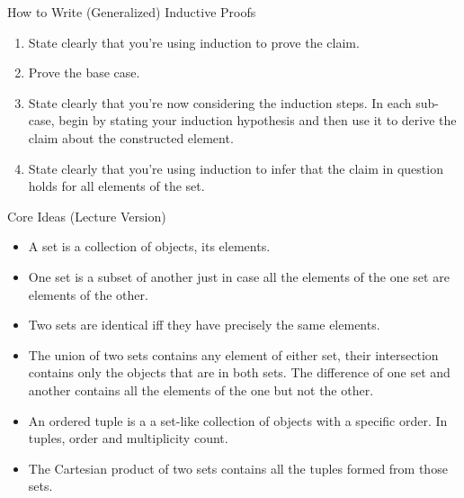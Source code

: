 \documentclass[../slides.tex]{subfiles}
\begin{document}
\begin{frame}{How to Write (Generalized) Inductive Proofs}


	\begin{enumerate}[1.]
		
			\item State clearly that you're using induction to prove the claim.
			
			\item Prove the base case. 
			
			\item State clearly that you're now considering the induction steps. In each sub-case, begin by stating your induction hypothesis and then use it to derive the claim about the constructed element.
			
			\item State clearly that you're using induction to infer that the claim in question holds for all elements of the set.
		
		\end{enumerate}
		

\end{frame}

\begin{frame}{Core Ideas (Lecture Version)}
	
\begin{itemize}

		\item A set is a collection of objects, its elements.
		
		\item One set is a subset of another just in case all the elements of the one set are elements of the other. 
				
		\item Two sets are identical iff they have precisely the same elements. 
		
		\item The union of two sets contains any element of either set, their intersection contains only the objects that are in both sets. The difference of one set and another contains all the elements of the one but not the other.
		
		\item An ordered tuple is a a set-like collection of objects with a specific order. In tuples, order and multiplicity count.
		
		\item The Cartesian product of two sets contains all the tuples formed from those sets.
		
		\end{itemize}
		
	\end{frame}
		
\end{document}
